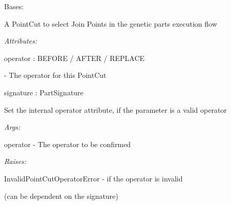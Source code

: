 \documentclass[letterpaper,10pt,english]{sphinxmanual}
\begin{document}
\begin{fulllineitems}
\label{modules/index:aosb.core.PointCut}
Bases: 

A PointCut to select Join Points in the genetic parts execution flow

\begin{DUlineblock}{0em}
\item[] \emph{Attributes:}
\item[]
\begin{DUlineblock}{\DUlineblockindent}
\item[] operator : BEFORE / AFTER / REPLACE 
\item[]
\begin{DUlineblock}{\DUlineblockindent}
\item[] - The operator for this PointCut
\end{DUlineblock}
\item[] signature : PartSignature
\end{DUlineblock}
\end{DUlineblock}

\begin{fulllineitems}
\label{modules/index:aosb.core.PointCut.checkAndSetOperator}
Set the internal operator attribute, if the parameter is a valid operator

\begin{DUlineblock}{0em}
\item[] \emph{Args:}
\item[]
\begin{DUlineblock}{\DUlineblockindent}
\item[] operator - The operator to be confirmed
\end{DUlineblock}
\end{DUlineblock}

\begin{DUlineblock}{0em}
\item[] \emph{Raises:}
\item[]
\begin{DUlineblock}{\DUlineblockindent}
\item[] InvalidPointCutOperatorError - if the operator is invalid
\item[]
\begin{DUlineblock}{\DUlineblockindent}
\item[] (can be dependent on the signature)
\end{DUlineblock}
\end{DUlineblock}
\end{DUlineblock}


\end{fulllineitems}
\end{fulllineitems}
\end{document}

